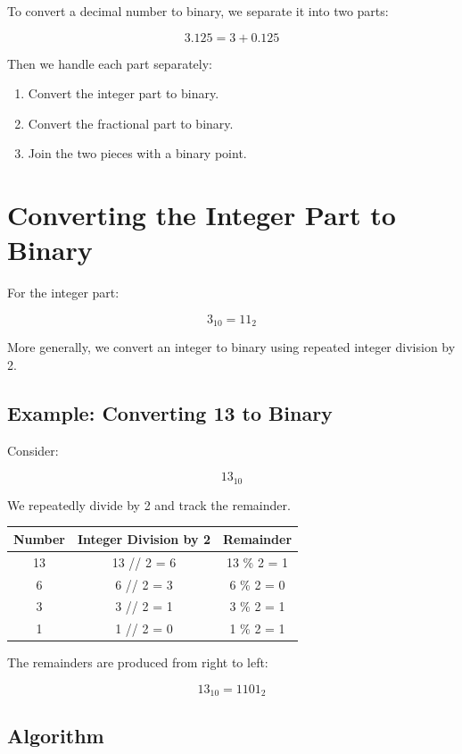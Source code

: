 \documentclass[11pt]{article}
\begin{document}
To convert a decimal number to binary, we separate it into two parts:

\[
3.125 = 3 + 0.125
\]

Then we handle each part separately:

\begin{enumerate}
    \item Convert the integer part to binary.
    \item Convert the fractional part to binary.
    \item Join the two pieces with a binary point.
\end{enumerate}

\section{Converting the Integer Part to Binary}

For the integer part:

\[
3_{10} = 11_2
\]

More generally, we convert an integer to binary using repeated integer division by 2.

\subsection{Example: Converting 13 to Binary}

Consider:

\[
13_{10}
\]

We repeatedly divide by 2 and track the remainder.

\begin{center}
\begin{tabular}{ccc}
\toprule
Number & Integer Division by 2 & Remainder \\
\midrule
13 & 13 // 2 = 6 & 13 \% 2 = 1 \\
6  & 6 // 2 = 3  & 6 \% 2 = 0 \\
3  & 3 // 2 = 1  & 3 \% 2 = 1 \\
1  & 1 // 2 = 0  & 1 \% 2 = 1 \\
\bottomrule
\end{tabular}
\end{center}

The remainders are produced from right to left:

\[
13_{10} = 1101_2
\]

\subsection{Algorithm}
\end{document}
